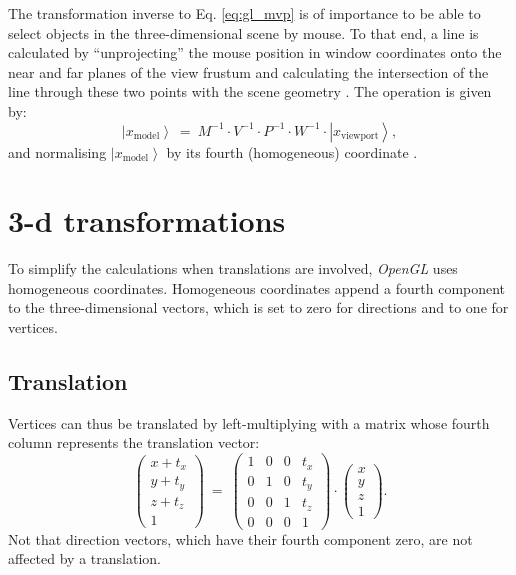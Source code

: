 The transformation inverse to Eq. \ref{eq:gl_mvp} is of importance to be able to select objects in the three-dimensional
scene by mouse. To that end, a line is calculated by ``unprojecting'' the mouse position in window coordinates
onto the near and far planes of the view frustum and calculating the intersection of the line through these
two points with the scene geometry \cite{web_gl_unproject}. The operation is given by:
\begin{equation}
	\left|x_{\mathrm{model}}\right> \ =\ M^{-1} \cdot V^{-1} \cdot P^{-1} \cdot  W^{-1} \cdot  \left| x_{\mathrm{viewport}} \right>,
\end{equation}
and normalising $\left|x_{\mathrm{model}}\right>$ by its fourth (homogeneous) coordinate \cite{web_gl_unproject}.



\section{3-d transformations}

To simplify the calculations when translations are involved, \textit{OpenGL} uses homogeneous coordinates.
Homogeneous coordinates append a fourth component to the three-dimensional vectors, which is set to zero for
directions and to one for vertices.


\subsection{Translation}
Vertices can thus be translated by left-multiplying with a matrix whose fourth column represents the translation
vector:
\begin{equation}
	\left( \begin{array}{c} x + t_x \\ y + t_y \\ z + t_z \\ 1 \end{array} \right) 
	\ =\  
	\left( \begin{array}{cccc} 
		1 & 0 & 0 & t_x \\
		0 & 1 & 0 & t_y \\
		0 & 0 & 1 & t_z \\
		0 & 0 & 0 & 1
	\end{array} \right) \cdot
	\left( \begin{array}{c} x \\ y \\ z \\ 1 \end{array} \right).
\end{equation}
Not that direction vectors, which have their fourth component zero, are not affected by a translation.


